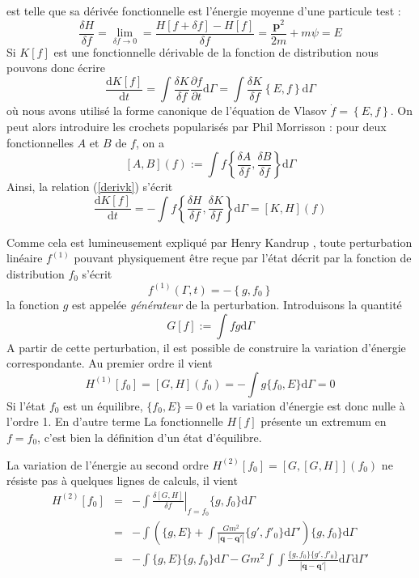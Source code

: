 est telle que sa dérivée fonctionnelle est l'énergie moyenne d'une particule test :
\[
\frac{\delta H}{\delta f}=\lim_{\delta f \to 0}=\dfrac{H\left[ f +\delta f\right]-H \left[ f \right]}{\delta f}
= \frac{\mathbf{p}^{2}}{2m} + m \psi=E
\]
Si $K[f]$ est une fonctionnelle dérivable de la fonction de distribution nous pouvons donc écrire
\begin{equation}
	\frac{\mathrm{d} K[f]}{\mathrm{d} t}
	= \int \frac{\delta K}{\delta f}
		\frac{\partial f}{\partial t} \mathrm{d} \Gamma
	= \int \frac{\delta K}{\delta f} \left\{ E, f \right\} \mathrm{d} \Gamma
	\label{derivk}
\end{equation}
où nous avons utilisé la forme canonique de l'équation de Vlasov $\dot f=\left\{ E, f \right\}$.
On peut alors introduire les crochets popularisés par Phil Morrisson \cite{morrison} :
pour deux fonctionnelles $A$ et $B$ de $f$, on a 
\[
	\left[ A, B \right](f) :=
	\int f \left\{
		\frac{\delta A}{\delta f}, \frac{\delta B}{\delta f}
	\right\} \mathrm{d} \Gamma
\]
Ainsi, la relation (\ref{derivk}) s'écrit
\begin{equation}
	\frac{\mathrm{d} K[f]}{\mathrm{d} t}
	= - \int f \left\{
		\frac{\delta H}{\delta f}, \frac{\delta K}{\delta f}
	\right\} \mathrm{d} \Gamma
	= \left[K, H \right](f)
\end{equation}

Comme cela est lumineusement expliqué par Henry Kandrup  \cite{kandrupstability},
toute perturbation linéaire $f^{(1)}$ pouvant physiquement être reçue par l'état décrit par la fonction de distribution $f_0$ s'écrit
\[
	f^{(1)}\left(  {\Gamma},t \right) = -\left\{ g,f_{0}\right\}
\]
la fonction $g$ est appelée \emph{générateur} de la perturbation. Introduisons la quantité
\[
	G[f] := \int f g \mathrm{d} \Gamma
\]
A partir de cette perturbation, il est possible de construire la variation d'énergie correspondante. Au  premier ordre il vient
\begin{equation*}
	H^{(1)} [f_0] = \left[G, H \right](f_0)
	= - \int g \{ f_0, E \} \mathrm{d} \Gamma
	= 0
\end{equation*}
Si l'état $f_0$ est un équilibre, $\{ f_0, E \} = 0$ et la variation d'énergie est donc nulle à l'ordre 1. En d'autre terme La fonctionnelle $H[f]$ présente un extremum en $f=f_0$, c'est bien la définition d'un état d'équilibre.

La variation de l'énergie au second ordre  
$
	H^{(2)} [f_{0}] = \left[G, [G,H] \right](f_0)
$
ne résiste pas à quelques lignes de calculs, il vient
\begin{eqnarray}
	H^{(2)}[f_{0}]
	& = & - \int \left.\frac{\delta [G,H]}{\delta f}\right|_{f=f_{0}} \{g,f_{0}\} \mathrm{d} \Gamma
	\nonumber \\
	& = & - \int \left(
		\{g,E\} + \int \frac{Gm^2}{|\mathbf{q}-\mathbf{q'}|}
		\{g',f'_{0}\} \mathrm{d} \Gamma'
	\right) \{g,f_{0}\} \mathrm{d} \Gamma
	\nonumber \\
	& = & - \int \{g,E\} \{g,f_{0}\} \mathrm{d} \Gamma
	- G m^2 \int\!\!\!\int \frac{\{g,f_{0}\}\{g',f'_{0}\}}{|\mathbf{q} - \mathbf{q'}|}
	\mathrm{d} \Gamma \mathrm{d} \Gamma'
\end{eqnarray}


